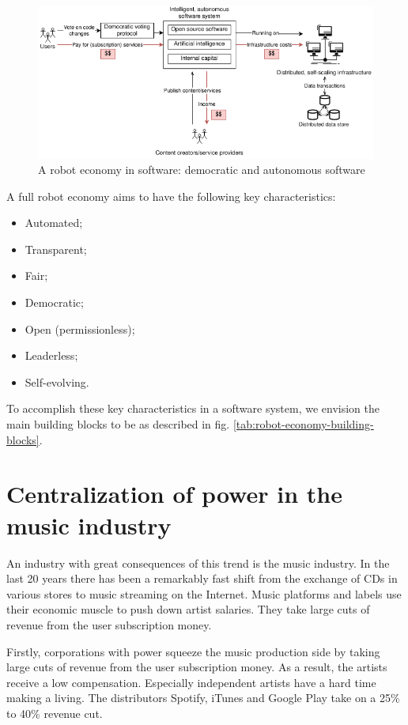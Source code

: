 \begin{figure}
    \centering
    \includegraphics[width=1\textwidth]{introduction/robot-economy.png}
    \caption{A robot economy in software: democratic and autonomous software}
    \label{fig:robot-economy-in-software}
\end{figure}

A full robot economy aims to have the following key characteristics: 
\begin{itemize}
    \item Automated;
    \item Transparent;
    \item Fair;
    \item Democratic;
    \item Open (permissionless);
    \item Leaderless;
    \item Self-evolving.
\end{itemize}
To accomplish these key characteristics in a software system, we envision the main building blocks to be as described in fig. \ref{tab:robot-economy-building-blocks}.

\section{Centralization of power in the music industry}
An industry with great consequences of this trend is the music industry. In the last 20 years there has been a remarkably fast shift from the exchange of CDs in various stores to music streaming on the Internet. Music platforms and labels use their economic muscle to push down artist salaries. They take large cuts of revenue from the user subscription money.

Firstly, corporations with power squeeze the music production side by taking large cuts of revenue from the user subscription money. As a result, the artists receive a low compensation. Especially independent artists have a hard time making a living. The distributors Spotify, iTunes and Google Play take on a 25\% to 40\% revenue cut.

